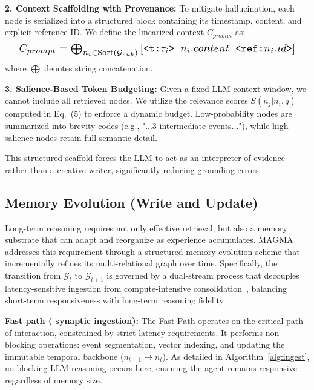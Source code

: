 \documentclass[11pt]{article}
\begin{document}
\textbf{2. Context Scaffolding with Provenance:} 
To mitigate hallucination, each node is serialized into a structured block containing its timestamp, content, and explicit reference ID. We define the linearized context $C_{prompt}$ as:
\begin{equation}
\resizebox{0.95\linewidth}{!}{$
    C_{prompt} = \bigoplus_{n_i \in \text{Sort}(\mathcal{G}_{sub})} \left[ \texttt{<t:}\tau_i\texttt{> } n_i.content \texttt{ <ref:} n_i.id \texttt{>} \right]
$}
\end{equation}
where $\bigoplus$ denotes string concatenation.

\textbf{3. Salience-Based Token Budgeting:} 
Given a fixed LLM context window, we cannot include all retrieved nodes. We utilize the relevance scores $S(n_j|n_i, q)$ computed in Eq.~(5) to enforce a dynamic budget. Low-probability nodes are summarized into brevity codes (e.g., "...3 intermediate events..."), while high-salience nodes retain full semantic detail. 

This structured scaffold forces the LLM to act as an interpreter of evidence rather than a creative writer, significantly reducing grounding errors.

\subsection{Memory Evolution (Write and Update)}
\label{sec:system:update}
Long-term reasoning requires not only effective retrieval, but also a memory substrate that can adapt and reorganize as experience accumulates. MAGMA addresses this requirement through a structured memory evolution scheme that incrementally refines its multi-relational graph over time. Specifically, the transition from $\mathcal{G}_t$ to $\mathcal{G}_{t+1}$ is governed by a dual-stream process that decouples latency-sensitive ingestion from compute-intensive consolidation~\cite{Kumaran2016}, balancing short-term responsiveness with long-term reasoning fidelity.



\noindent\textbf{Fast path ( synaptic ingestion):}
The Fast Path operates on the critical path of interaction, constrained by strict latency requirements. It performs non-blocking operations: event segmentation, vector indexing, and updating the immutable temporal backbone ($n_{t-1} \rightarrow n_t$). As detailed in Algorithm~\ref{alg:ingest}, no blocking LLM reasoning occurs here, ensuring the agent remains responsive regardless of memory size.
\end{document}
